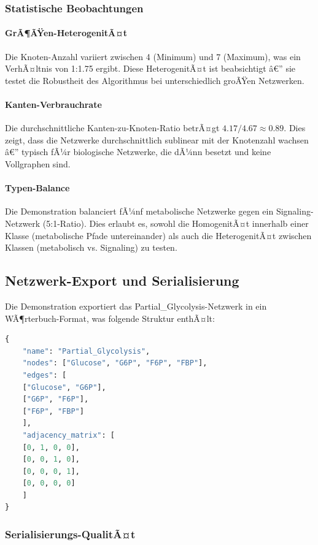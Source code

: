 ﻿\documentclass[a4paper,12pt]{article}
\theoremstyle{definition}
\begin{document}
\subsubsection{Statistische Beobachtungen}

\paragraph{GrÃ¶ÃŸen-HeterogenitÃ¤t}
Die Knoten-Anzahl variiert zwischen 4 (Minimum) und 7 (Maximum), was ein VerhÃ¤ltnis von 1:1.75 ergibt. Diese HeterogenitÃ¤t ist beabsichtigt â€” sie testet die Robustheit des Algorithmus bei unterschiedlich groÃŸen Netzwerken.

\paragraph{Kanten-Verbrauchrate}
Die durchschnittliche Kanten-zu-Knoten-Ratio betrÃ¤gt $4.17 / 4.67 \approx 0.89$. Dies zeigt, dass die Netzwerke durchschnittlich sublinear mit der Knotenzahl wachsen â€” typisch fÃ¼r biologische Netzwerke, die dÃ¼nn besetzt und keine Vollgraphen sind.

\paragraph{Typen-Balance}
Die Demonstration balanciert fÃ¼nf metabolische Netzwerke gegen ein Signaling-Netzwerk (5:1-Ratio). Dies erlaubt es, sowohl die HomogenitÃ¤t innerhalb einer Klasse (metabolische Pfade untereinander) als auch die HeterogenitÃ¤t zwischen Klassen (metabolisch vs. Signaling) zu testen.

\subsection{Netzwerk-Export und Serialisierung}

Die Demonstration exportiert das Partial\_Glycolysis-Netzwerk in ein WÃ¶rterbuch-Format, was folgende Struktur enthÃ¤lt:

\begin{lstlisting}[language=Python, caption=Exportiertes Netzwerk-Format]
{
	"name": "Partial_Glycolysis",
	"nodes": ["Glucose", "G6P", "F6P", "FBP"],
	"edges": [
	["Glucose", "G6P"],
	["G6P", "F6P"],
	["F6P", "FBP"]
	],
	"adjacency_matrix": [
	[0, 1, 0, 0],
	[0, 0, 1, 0],
	[0, 0, 0, 1],
	[0, 0, 0, 0]
	]
}
\end{lstlisting}

\subsubsection{Serialisierungs-QualitÃ¤t}
\end{document}
